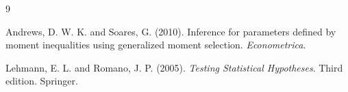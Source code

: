 \documentclass[12pt]{article}
\theoremstyle{remark}
\begin{document}
\begin{thebibliography}{9}

Andrews, D. W. K. and Soares, G. (2010).
Inference for parameters defined by moment inequalities using generalized moment selection.
\emph{Econometrica}.

Lehmann, E. L. and Romano, J. P. (2005).
\emph{Testing Statistical Hypotheses}.
Third edition. Springer.

\end{thebibliography}
\end{document}
